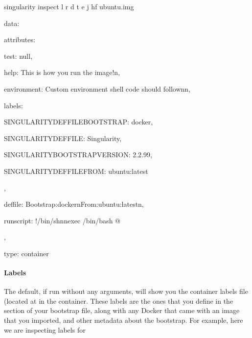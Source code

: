 \documentclass[letterpaper,10pt,english]{sphinxmanual}
\begin{document}
%
\begin{sphinxVerbatim}[commandchars=\\\{\}]
\PYGZdl{} singularity inspect \PYGZhy{}l \PYGZhy{}r \PYGZhy{}d \PYGZhy{}t \PYGZhy{}e \PYGZhy{}j \PYGZhy{}hf ubuntu.img

\PYGZob{}

    \PYGZdq{}data\PYGZdq{}: \PYGZob{}

        \PYGZdq{}attributes\PYGZdq{}: \PYGZob{}

            \PYGZdq{}test\PYGZdq{}: null,

            \PYGZdq{}help\PYGZdq{}: \PYGZdq{}This is how you run the image!\PYGZbs{}n\PYGZdq{},

            \PYGZdq{}environment\PYGZdq{}: \PYGZdq{}\PYGZsh{} Custom environment shell code should follow\PYGZbs{}n\PYGZbs{}n\PYGZdq{},

            \PYGZdq{}labels\PYGZdq{}: \PYGZob{}

                \PYGZdq{}SINGULARITY\PYGZus{}DEFFILE\PYGZus{}BOOTSTRAP\PYGZdq{}: \PYGZdq{}docker\PYGZdq{},

                \PYGZdq{}SINGULARITY\PYGZus{}DEFFILE\PYGZdq{}: \PYGZdq{}Singularity\PYGZdq{},

                \PYGZdq{}SINGULARITY\PYGZus{}BOOTSTRAP\PYGZus{}VERSION\PYGZdq{}: \PYGZdq{}2.2.99\PYGZdq{},

                \PYGZdq{}SINGULARITY\PYGZus{}DEFFILE\PYGZus{}FROM\PYGZdq{}: \PYGZdq{}ubuntu:latest\PYGZdq{}

            \PYGZcb{},

            \PYGZdq{}deffile\PYGZdq{}: \PYGZdq{}Bootstrap:docker\PYGZbs{}nFrom:ubuntu:latest\PYGZbs{}n\PYGZdq{},

            \PYGZdq{}runscript\PYGZdq{}: \PYGZdq{}\PYGZsh{}!/bin/sh\PYGZbs{}n\PYGZbs{}nexec /bin/bash \PYGZbs{}\PYGZdq{}\PYGZdl{}@\PYGZbs{}\PYGZdq{}\PYGZdq{}

        \PYGZcb{},

        \PYGZdq{}type\PYGZdq{}: \PYGZdq{}container\PYGZdq{}

    \PYGZcb{}

\PYGZcb{}
\end{sphinxVerbatim}


\paragraph{Labels}
\label{\detokenize{appendix:labels}}
The default, if run without any arguments, will show you the container
labels file (located at  in the container. These labels are the ones that
you define in the  section of your bootstrap file, along with any Docker 
that came with an image that you imported, and other metadata about the
bootstrap. For example, here we are inspecting labels for 
\end{document}
